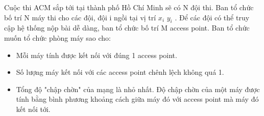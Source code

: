 Cuộc thi ACM sắp tới tại thành phố Hồ Chí Minh sẽ có N đội thi. Ban tổ chức bố trí N máy thi cho các đội, đội i ngồi tại vị trí $x_{i}$ $y_{i}$ . Để các đội có thể truy cập hệ thống nộp bài dễ dàng, ban tổ chức bố trí M access point. Ban tổ chức muốn tổ chức phòng máy sao cho:
\begin{itemize}
	\item Mỗi máy tính được kết nối với đúng 1 access point.
	\item Số lượng máy kết nối với các access point chênh lệch không quá 1.
	\item Tổng độ "chập chờn" của mạng là nhỏ nhất. Độ chập chờn của một máy được tính bằng bình phương khoảng cách giữa máy đó với access point mà máy đó kết nối tới.
\end{itemize}